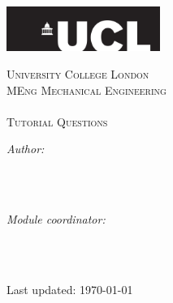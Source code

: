 \begin{titlepage}

  \newcommand{\HRule}{\rule{\linewidth}{0.5mm}} %


  \center
  \includegraphics[width=5cm]{Title/UCL.png}\\[1cm] %

  \center %


  \textsc{\LARGE University College London }\\[1.5cm]
  \textsc{\Large MEng Mechanical Engineering  }\\[0.5cm]
  \textsc{\large \mymodulename }\\[1.5cm]

  \makeatletter
  { \huge \textsc{Tutorial Questions}}\\[1.5cm] %


  \begin{minipage}{0.4\textwidth}
    \begin{flushleft} \large
      \emph{Author:}\\
      \myauthor
      \\[1.2em]
    \end{flushleft}
  \end{minipage}
  ~
  \begin{minipage}{0.4\textwidth}
    \begin{flushright} \large
      \emph{Module coordinator:} \\
      \myprof \\[1.2em]
    \end{flushright}
  \end{minipage}\\[2cm]
  \makeatother


  {\large Last updated: \today}\\[2cm]
  \vfill %

\end{titlepage}